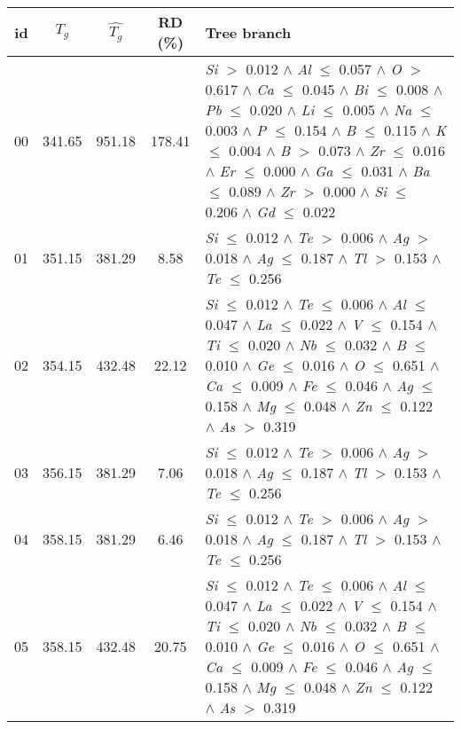 \documentclass{article}
\begin{document}
\begin{table}[!htbp]
	\setlength{\tabcolsep}{3pt}
	\begin{tabular}{ccccm{}}
		\toprule
		id & $T_g$ & $\hat{T_g}$ & RD (\%) & Tree branch\\
		\midrule
		00 & 341.65 & 951.18 & 178.41 & \textit{Si} $>$ 0.012 $\wedge$ \textit{Al} $\le$ 0.057 $\wedge$ \textit{O} $>$ 0.617 $\wedge$ \textit{Ca} $\le$ 0.045 $\wedge$ \textit{Bi} $\le$ 0.008 $\wedge$ \textit{Pb} $\le$ 0.020 $\wedge$ \textit{Li} $\le$ 0.005 $\wedge$ \textit{Na} $\le$ 0.003 $\wedge$ \textit{P} $\le$ 0.154 $\wedge$ \textit{B} $\le$ 0.115 $\wedge$ \textit{K} $\le$ 0.004 $\wedge$ \textit{B} $>$ 0.073 $\wedge$ \textit{Zr} $\le$ 0.016 $\wedge$ \textit{Er} $\le$ 0.000 $\wedge$ \textit{Ga} $\le$ 0.031 $\wedge$ \textit{Ba} $\le$ 0.089 $\wedge$ \textit{Zr} $>$ 0.000 $\wedge$ \textit{Si} $\le$ 0.206 $\wedge$ \textit{Gd} $\le$ 0.022\\
		\hline
		01 & 351.15 & 381.29 & 8.58 & \textit{Si} $\le$ 0.012 $\wedge$ \textit{Te} $>$ 0.006 $\wedge$ \textit{Ag} $>$ 0.018 $\wedge$ \textit{Ag} $\le$ 0.187 $\wedge$ \textit{Tl} $>$ 0.153 $\wedge$ \textit{Te} $\le$ 0.256\\
		\hline
		02 & 354.15 & 432.48 & 22.12 & \textit{Si} $\le$ 0.012 $\wedge$ \textit{Te} $\le$ 0.006 $\wedge$ \textit{Al} $\le$ 0.047 $\wedge$ \textit{La} $\le$ 0.022 $\wedge$ \textit{V} $\le$ 0.154 $\wedge$ \textit{Ti} $\le$ 0.020 $\wedge$ \textit{Nb} $\le$ 0.032 $\wedge$ \textit{B} $\le$ 0.010 $\wedge$ \textit{Ge} $\le$ 0.016 $\wedge$ \textit{O} $\le$ 0.651 $\wedge$ \textit{Ca} $\le$ 0.009 $\wedge$ \textit{Fe} $\le$ 0.046 $\wedge$ \textit{Ag} $\le$ 0.158 $\wedge$ \textit{Mg} $\le$ 0.048 $\wedge$ \textit{Zn} $\le$ 0.122 $\wedge$ \textit{As} $>$ 0.319\\
		\hline
		03 & 356.15 & 381.29 & 7.06 & \textit{Si} $\le$ 0.012 $\wedge$ \textit{Te} $>$ 0.006 $\wedge$ \textit{Ag} $>$ 0.018 $\wedge$ \textit{Ag} $\le$ 0.187 $\wedge$ \textit{Tl} $>$ 0.153 $\wedge$ \textit{Te} $\le$ 0.256\\
		\hline
		04 & 358.15 & 381.29 & 6.46 & \textit{Si} $\le$ 0.012 $\wedge$ \textit{Te} $>$ 0.006 $\wedge$ \textit{Ag} $>$ 0.018 $\wedge$ \textit{Ag} $\le$ 0.187 $\wedge$ \textit{Tl} $>$ 0.153 $\wedge$ \textit{Te} $\le$ 0.256\\
		\hline
		05 & 358.15 & 432.48 & 20.75 & \textit{Si} $\le$ 0.012 $\wedge$ \textit{Te} $\le$ 0.006 $\wedge$ \textit{Al} $\le$ 0.047 $\wedge$ \textit{La} $\le$ 0.022 $\wedge$ \textit{V} $\le$ 0.154 $\wedge$ \textit{Ti} $\le$ 0.020 $\wedge$ \textit{Nb} $\le$ 0.032 $\wedge$ \textit{B} $\le$ 0.010 $\wedge$ \textit{Ge} $\le$ 0.016 $\wedge$ \textit{O} $\le$ 0.651 $\wedge$ \textit{Ca} $\le$ 0.009 $\wedge$ \textit{Fe} $\le$ 0.046 $\wedge$ \textit{Ag} $\le$ 0.158 $\wedge$ \textit{Mg} $\le$ 0.048 $\wedge$ \textit{Zn} $\le$ 0.122 $\wedge$ \textit{As} $>$ 0.319\\

\end{tabular}
\end{table}
\end{document}
